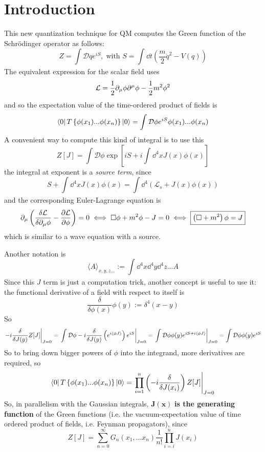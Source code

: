 \section{Introduction}
This new quantization technique for QM computes the Green function of the
Schrödinger operator as follows:
\[
    Z = \int \mathcal{D}q e^{iS},\;\text{with } S=\int_{}^{} \dd t \left(
    \frac{m}{2}\dot q^2-V(q)\right)
\]
The equivalent expression for the scalar field uses
\[
    \mathcal{L} = \frac{1}{2}\partial_\mu\phi\partial^\mu\phi - \frac{1}{2}m^2\phi^2
\]
and so the expectation value of the time-ordered product of fields is
\[
    \bra{0}T\left\{\phi(x_1)...\phi(x_n)\right\}\ket{0} =
    \int \mathcal{D}\phi e^{iS} \phi(x_1)...\phi(x_n)
\]
A convenient way to compute this kind of integral is to use this
\[
    Z[J]=\int \mathcal{D}\phi \exp\left[ iS + i\int_{}^{} \dd^4x J(x)\phi(x)
    \right] 
\]
the integral at exponent is a \textit{source term}, since
\[
S+\int_{}^{} \dd^4x J(x)\phi(x) = \int\dd^4\left(\mathcal{L}_s+J(x)\phi(x)\right)
\]
and the corresponding Euler-Lagrange equation is
\[
\partial_\mu\left(\frac{\delta\mathcal{L}}{\delta\partial_\mu\phi}-
\pdv{\mathcal{L}}{\phi}\right) = 0 \iff \Box\phi +m^2\phi -J = 0 \iff
\boxed{\left(\Box+m^2\right)\phi = J}
\]
which is similar to a wave equation with a source.

Another notation is
\[
    \langle A \rangle_{x,y,z...} := \int_{}^{} \dd^4x\dd^4y\dd^4z... A
\]
Since this $J$ term is just a computation trick, another concept is useful
to use it: the functional derivative of a field with respect to itself is
\[
\frac{\delta}{\delta \phi(x)}\phi(y):=\delta^4(x-y)
\]
So
\[\eval{-i\frac{\delta}{\delta J(y)} Z[J] }_{J=0}=\eval{ \int \mathcal{D}\phi -i
\frac{\delta}{\delta J(y)}\left(e^{i\langle\phi J\rangle}\right)e^{iS}}_{J=0}=
\eval{\int \mathcal{D}\phi \phi(y)e^{iS + i\langle\phi J\rangle}}_{J=0}=
\int \mathcal{D}\phi\phi(y)e^{iS}
\]
So to bring down bigger powers of $\phi$ into the integrand, more derivatives
are required, so
\[
\bra{0}T\left\{\phi(x_1)...\phi(x_n)\right\}\ket{0} = 
\eval{\prod_{i=1}^{n} \left(-i\frac{\delta}{\delta J(x_i)}\right) Z[J]}_{J=0}
\]
So, in parallelism with the Gaussian integrals, $\mathbf{J(x)}$ \textbf{is the
generating function} of the Green functions (i.e. the vacuum-expectation
value of time ordered product of fields, i.e. Feynman propagators), since
\[
    Z[J]=\sum_{n=0}^{\infty}G_n(x_1,...x_n)\frac{1}{n!}\prod_{i=i}^{n}J(x_i)
\]

